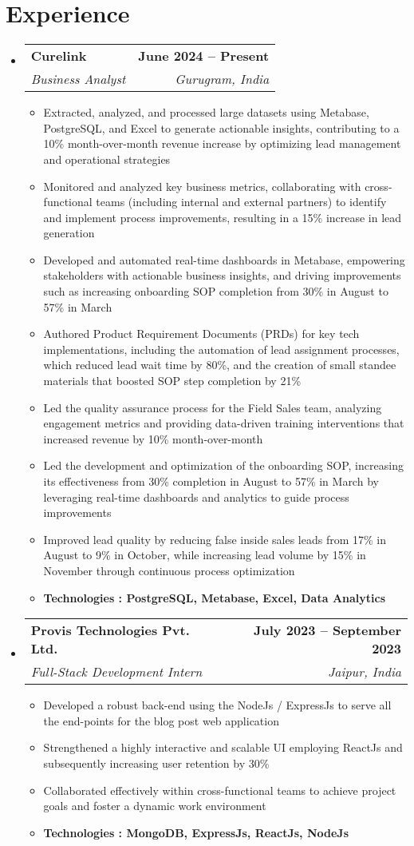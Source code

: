 \documentclass[letterpaper,11pt]{article}
\makeatletter
\newcommand{\resumeItem}[1]{
  \item\small{
    {#1 \vspace{-2pt}}
  }
}
\newcommand{\resumeSubheading}[4]{
  \vspace{-2pt}\item
    \begin{tabular*}{1.0\textwidth}[t]{l@{\extracolsep{\fill}}r}
      \textbf{#1} & \textbf{\small #2} \\
      \textit{\small#3} & \textit{\small #4} \\
    \end{tabular*}\vspace{-7pt}
}
\newcommand{\resumeSubHeadingListStart}{\begin{itemize}[leftmargin=0.0in, label={}]}
\newcommand{\resumeSubHeadingListEnd}{\end{itemize}}
\newcommand{\resumeItemListStart}{\begin{itemize}}
\newcommand{\resumeItemListEnd}{\end{itemize}\vspace{-5pt}}
\makeatother
\begin{document}
\section{Experience}
  \resumeSubHeadingListStart
    \resumeSubheading
    {Curelink}{June 2024 -- Present}{Business Analyst}{Gurugram, India}
    \resumeItemListStart
        \resumeItem{Extracted, analyzed, and processed large datasets using Metabase, PostgreSQL, and Excel to generate actionable insights, contributing to a 10\% month-over-month revenue increase by optimizing lead management and operational strategies}
        \resumeItem{Monitored and analyzed key business metrics, collaborating with cross-functional teams (including internal and external partners) to identify and implement process improvements, resulting in a 15\% increase in lead generation}
        \resumeItem{Developed and automated real-time dashboards in Metabase, empowering stakeholders with actionable business insights, and driving improvements such as increasing onboarding SOP completion from 30\% in August to 57\% in March}
        \resumeItem{Authored Product Requirement Documents (PRDs) for key tech implementations, including the automation of lead assignment processes, which reduced lead wait time by 80\%, and the creation of small standee materials that boosted SOP step completion by 21\%}
        \resumeItem{Led the quality assurance process for the Field Sales team, analyzing engagement metrics and providing data-driven training interventions that increased revenue by 10\% month-over-month}
        \resumeItem{Led the development and optimization of the onboarding SOP, increasing its effectiveness from 30\% completion in August to 57\% in March by leveraging real-time dashboards and analytics to guide process improvements}
        \resumeItem{Improved lead quality by reducing false inside sales leads from 17\% in August to 9\% in October, while increasing lead volume by 15\% in November through continuous process optimization}
        \resumeItem{\textbf{Technologies : PostgreSQL, Metabase, Excel, Data Analytics}}
    \resumeItemListEnd
    \resumeSubheading
      {Provis Technologies Pvt. Ltd.}{July 2023 -- September 2023}
      {Full-Stack Development Intern}{Jaipur, India}
      \resumeItemListStart
        \resumeItem{Developed a robust
 back-end using the NodeJs / ExpressJs to serve all the end-points for the blog post web application}
        \resumeItem{Strengthened a highly interactive and scalable UI employing ReactJs and subsequently increasing user retention by 30\%}
        \resumeItem{Collaborated effectively within cross-functional teams to achieve project goals and foster a dynamic work environment}
        \resumeItem{\textbf{Technologies : MongoDB, ExpressJs, ReactJs, NodeJs}}
        \vspace{5px}
      \resumeItemListEnd
  \resumeSubHeadingListEnd
\vspace{-16pt}
%
\end{document}
